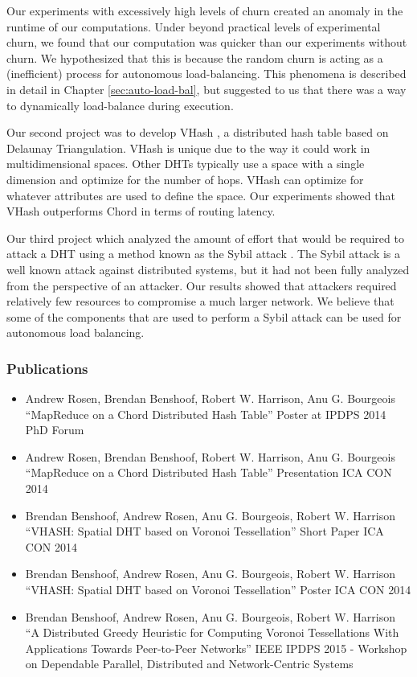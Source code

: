 Our experiments with excessively high levels of churn created an anomaly in the runtime of our computations.
Under beyond practical levels of experimental churn, we found that our computation was quicker than our experiments without churn.
We hypothesized that this is because the random churn is acting as a (inefficient) process for autonomous load-balancing.
This phenomena is described in detail in Chapter \ref{sec:auto-load-bal}, but suggested to us that there was a way to  dynamically load-balance during execution.

Our second project was to develop VHash \cite{dgvh} \cite{vhash}, a distributed hash table based on Delaunay Triangulation.
VHash is unique due to the way it could work in multidimensional spaces.
Other DHTs typically use a space with a single dimension and optimize for the number of hops.
VHash can optimize for whatever attributes are used to define the space. 
Our experiments showed that VHash outperforms Chord in terms of routing latency.



Our third project which analyzed the amount of effort that would be required to attack a DHT using a method known as the Sybil attack \cite{sybil-analysis}.
The Sybil attack \cite{sybil} is a well known attack against distributed systems, but it had not been fully analyzed from the perspective of an attacker.
Our results showed that attackers required relatively few resources to compromise a much larger network.
We believe that some of the components that are used to perform a Sybil attack can be used for autonomous load balancing.



\subsubsection{Publications}

\begin{itemize}
	\item Andrew Rosen, Brendan Benshoof, Robert W. Harrison, Anu G. Bourgeois ``MapReduce on a Chord Distributed Hash Table'' Poster at IPDPS 2014 PhD Forum \cite{chordreduce}
	\item Andrew Rosen, Brendan Benshoof, Robert W. Harrison, Anu G. Bourgeois ``MapReduce on a Chord Distributed Hash Table'' Presentation ICA CON 2014
	\item Brendan Benshoof, Andrew Rosen, Anu G. Bourgeois, Robert W. Harrison ``VHASH: Spatial DHT based on Voronoi Tessellation'' Short Paper ICA CON 2014 \cite{vhash}
	\item Brendan Benshoof, Andrew Rosen, Anu G. Bourgeois, Robert W. Harrison ``VHASH: Spatial DHT based on Voronoi Tessellation'' Poster ICA CON 2014 
	\item Brendan Benshoof, Andrew Rosen, Anu G. Bourgeois, Robert W. Harrison ``A Distributed Greedy Heuristic for Computing Voronoi Tessellations With Applications Towards Peer-to-Peer Networks'' IEEE IPDPS 2015 - Workshop on Dependable Parallel, Distributed and Network-Centric Systems \cite{dgvh}
	
\end{itemize}

